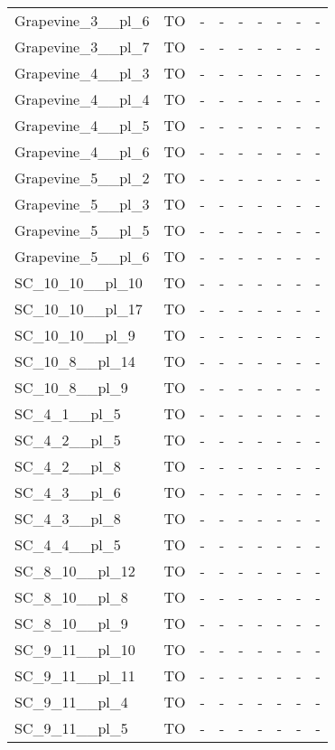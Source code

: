 \documentclass{article}
\begin{document}
\begin{tabular}{lcccccccc}
Grapevine\_3\_\_pl\_6 & TO & - & - & - & - & - & - & - \\
Grapevine\_3\_\_pl\_7 & TO & - & - & - & - & - & - & - \\
Grapevine\_4\_\_pl\_3 & TO & - & - & - & - & - & - & - \\
Grapevine\_4\_\_pl\_4 & TO & - & - & - & - & - & - & - \\
Grapevine\_4\_\_pl\_5 & TO & - & - & - & - & - & - & - \\
Grapevine\_4\_\_pl\_6 & TO & - & - & - & - & - & - & - \\
Grapevine\_5\_\_pl\_2 & TO & - & - & - & - & - & - & - \\
Grapevine\_5\_\_pl\_3 & TO & - & - & - & - & - & - & - \\
Grapevine\_5\_\_pl\_5 & TO & - & - & - & - & - & - & - \\
Grapevine\_5\_\_pl\_6 & TO & - & - & - & - & - & - & - \\
SC\_10\_10\_\_pl\_10 & TO & - & - & - & - & - & - & - \\
SC\_10\_10\_\_pl\_17 & TO & - & - & - & - & - & - & - \\
SC\_10\_10\_\_pl\_9 & TO & - & - & - & - & - & - & - \\
SC\_10\_8\_\_pl\_14 & TO & - & - & - & - & - & - & - \\
SC\_10\_8\_\_pl\_9 & TO & - & - & - & - & - & - & - \\
SC\_4\_1\_\_pl\_5 & TO & - & - & - & - & - & - & - \\
SC\_4\_2\_\_pl\_5 & TO & - & - & - & - & - & - & - \\
SC\_4\_2\_\_pl\_8 & TO & - & - & - & - & - & - & - \\
SC\_4\_3\_\_pl\_6 & TO & - & - & - & - & - & - & - \\
SC\_4\_3\_\_pl\_8 & TO & - & - & - & - & - & - & - \\
SC\_4\_4\_\_pl\_5 & TO & - & - & - & - & - & - & - \\
SC\_8\_10\_\_pl\_12 & TO & - & - & - & - & - & - & - \\
SC\_8\_10\_\_pl\_8 & TO & - & - & - & - & - & - & - \\
SC\_8\_10\_\_pl\_9 & TO & - & - & - & - & - & - & - \\
SC\_9\_11\_\_pl\_10 & TO & - & - & - & - & - & - & - \\
SC\_9\_11\_\_pl\_11 & TO & - & - & - & - & - & - & - \\
SC\_9\_11\_\_pl\_4 & TO & - & - & - & - & - & - & - \\
SC\_9\_11\_\_pl\_5 & TO & - & - & - & - & - & - & - \\

\end{tabular}
\end{document}
